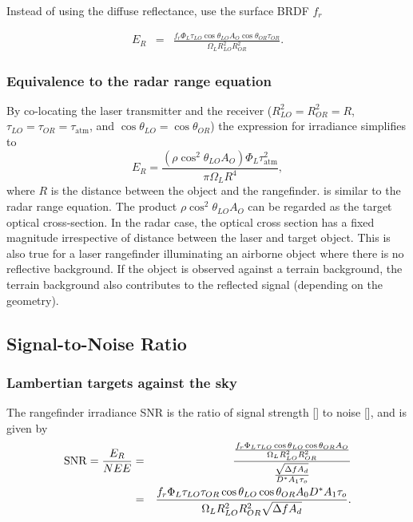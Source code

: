 Instead of using the diffuse reflectance, use the surface BRDF $f_r$

\begin{eqnarray}
E_R&=&\frac{
f_r \Phi_L \tau_{LO} \cos\theta_{LO} A_O \cos\theta_{OR} \tau_{OR}
}{
\Omega_L R^2_{LO}R^2_{OR}
}\label{erbrdf}.
\end{eqnarray}


\subsubsection{Equivalence to the radar range equation}


By co-locating the laser transmitter and the receiver ($R^2_{LO}=R^2_{OR}=R$, $\tau_{LO}=\tau_{OR}=\tau_\textrm{atm}$, and $\cos\theta_{LO}= \cos\theta_{OR}$) the expression for irradiance simplifies to
\begin{equation}
E_R = \frac{
(\rho \cos^2\theta_{LO} A_O)
\Phi_L \tau_\textrm{atm}^2
}{
\pi \Omega_L R^4
},\label{radar}
\end{equation}
where $R$ is the distance between the object and the rangefinder.
 is similar to the radar range equation. The product $\rho\cos^2\theta_{LO} A_O$ can be regarded as the target optical cross-section. In the radar case, the optical cross section has a fixed magnitude irrespective of distance between the laser and target object. This is also true for a laser rangefinder illuminating an airborne object where there is no reflective background.  If the object is observed against a terrain background, the terrain background also contributes to the reflected signal (depending on the geometry).




\subsection{Signal-to-Noise Ratio}

\subsubsection{Lambertian targets against the sky}

\noindent
The rangefinder irradiance SNR is the ratio of signal strength
[] to noise [], and is given by
\begin{eqnarray}
\operatorname{SNR} = \frac{E_R}{NEE}&=&\frac{
\frac{
f_r  \Phi_L \tau_{LO} \cos\theta_{LO} \cos\theta_{OR} A_O
}{
 \Omega_L R^2_{LO}R^2_{OR} }
}{\frac{\sqrt{\Delta f A_d}}{D^\ast A_1 \tau_o}}\\
&=&\frac{f_r \Phi_L
\tau_{LO}\tau_{OR} \cos\theta_{LO} \cos\theta_{OR}A_0D^\ast A_1 \tau_o}
{\Omega_L R^2_{LO}R^2_{OR}
\sqrt{\Delta f A_d}}.
\end{eqnarray}

